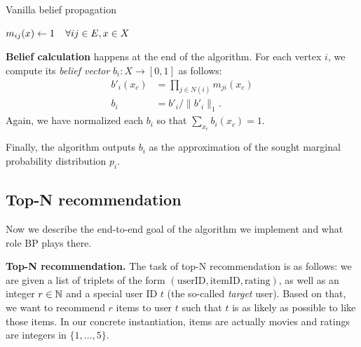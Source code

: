 \documentclass[draft,letterpaper]{article}
\newcommand{\mypar}[1]{{\bf #1.}}
\newcommand{\myparcont}[1]{{\bf #1}}
\begin{document}
\begin{algorithm}
\caption{Vanilla belief propagation}
\label{algo:propagate}
\algodefaults
	$m_{ij}(x) \leftarrow 1\mkern 20mu\forall ij \in E, x \in X$\;
	
\end{algorithm}

\myparcont{Belief calculation} happens at the end of the algorithm. For each
vertex $i$, we compute its \emph{belief vector} $b_i: X \to [0, 1]$ as follows:
%
\begin{align*}
	b'_i(x_c) &= \prod_{j \in N(i)} m_{ji}(x_c) \\
	b_i &= b'_{i} / \|b'_i\|_1.
\end{align*}
%
Again, we have normalized each $b_i$ so that $\sum_{x_c} b_i(x_c) = 1$.

Finally, the algorithm outputs $b_i$ as the approximation of the sought
marginal probability distribution $p_i$.

\subsection{Top-N recommendation} \label{subsec:topn}

Now we describe the end-to-end goal of the algorithm we implement and what role
BP plays there.

\mypar{Top-N recommendation} The task of top-N recommendation is as follows: we
are given a list of triplets of the form $(\text{userID}, \text{itemID},
\text{rating})$, as well as an integer $r\in\mathbb{N}$ and a special user ID $t$ (the
so-called \emph{target} user). Based on that, we want to recommend $r$ items to
user $t$ such that $t$ is as likely as possible to like those items.
%
In our concrete instantiation, items are actually movies and ratings are
integers in $\{1, \ldots, 5\}$.
\end{document}
